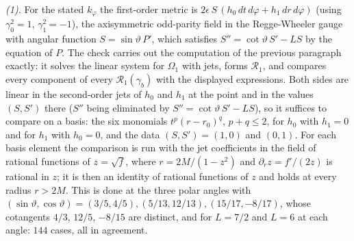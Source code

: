 \emph{(1).} For the stated $k_{\varphi}$ the first-order metric is $2\epsilon\,S\,(h_{0}\,dt\,d\varphi + h_{1}\,dr\,d\varphi)$ (using $\gamma_{0}^{2} = 1$, $\gamma_{1}^{2} = -1$), the axisymmetric odd-parity field in the Regge-Wheeler gauge with angular function $S = \sin\vartheta\,P'$, which satisfies $S'' = \cot\vartheta\,S' - LS$ by the equation of $P$. The check carries out the computation of the previous paragraph exactly: it solves the linear system for $\Omega_{1}$ with jets, forms $\mathcal{R}_{1}$, and compares every component of every $\mathcal{R}_{1}(\gamma_{b})$ with the displayed expressions. Both sides are linear in the second-order jets of $h_{0}$ and $h_{1}$ at the point and in the values $(S, S')$ there ($S''$ being eliminated by $S'' = \cot\vartheta\,S' - LS$), so it suffices to compare on a basis: the six monomials $t^{p}(r - r_{0})^{q}$, $p + q \leq 2$, for $h_{0}$ with $h_{1} = 0$ and for $h_{1}$ with $h_{0} = 0$, and the data $(S, S') = (1, 0)$ and $(0, 1)$. For each basis element the comparison is run with the jet coefficients in the field of rational functions of $z = \sqrt f$, where $r = 2M/(1 - z^{2})$ and $\partial_{r}z = f'/(2z)$ is rational in $z$; it is then an identity of rational functions of $z$ and holds at every radius $r > 2M$. This is done at the three polar angles with $(\sin\vartheta, \cos\vartheta) = (3/5, 4/5), (5/13, 12/13), (15/17, -8/17)$, whose cotangents $4/3$, $12/5$, $-8/15$ are distinct, and for $L = 7/2$ and $L = 6$ at each angle: $144$ cases, all in agreement.

